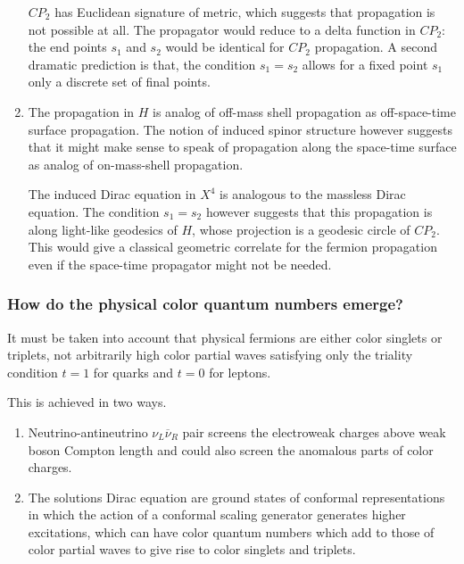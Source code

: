 \documentclass[10pt,epsf]{article}
\begin{document}
\begin{enumerate}
$CP_2$ has Euclidean signature of metric, which suggests that propagation is not possible at all. The propagator would reduce  to a delta function in $CP_2$: the end points $s_1$ and $s_2$ would be identical for $CP_2$ propagation. A second dramatic prediction is that,  the condition $s_1=s_2$  allows for a fixed point $s_1$ only a discrete set of final points.

\item  The  propagation in $H$ is analog of off-mass shell propagation  as off-space-time surface propagation. The notion of induced spinor structure however suggests that it  might make  sense to speak of propagation along the space-time surface as analog of on-mass-shell propagation.  

The induced Dirac equation in $X^4$ is analogous to the massless Dirac equation.  The condition $s_1=s_2$ however suggests that this propagation is along light-like geodesics   of $H$, whose projection is a geodesic circle of $CP_2$. This would give a classical geometric correlate for the  fermion propagation even if the space-time propagator might not be needed.

\end{enumerate}


\subsubsection{How do the physical color quantum numbers emerge?}

 It must be taken into account that physical fermions are either color singlets or triplets, not arbitrarily high color partial waves satisfying only the triality condition $t=1$ for quarks and $t=0$ for leptons.

This is achieved in  two ways. 

\begin{enumerate}

\item Neutrino-antineutrino $\nu_L\overline{\nu}_R$ pair screens the electroweak charges above weak boson Compton length and could also screen the anomalous parts of color charges.

\item  The solutions   Dirac equation are ground states of   conformal representations in which   the  action of a conformal  scaling generator generates higher excitations,  which can have color quantum numbers which  add to those of color partial waves to give rise to color singlets and triplets.

\end{enumerate}
\end{document}
